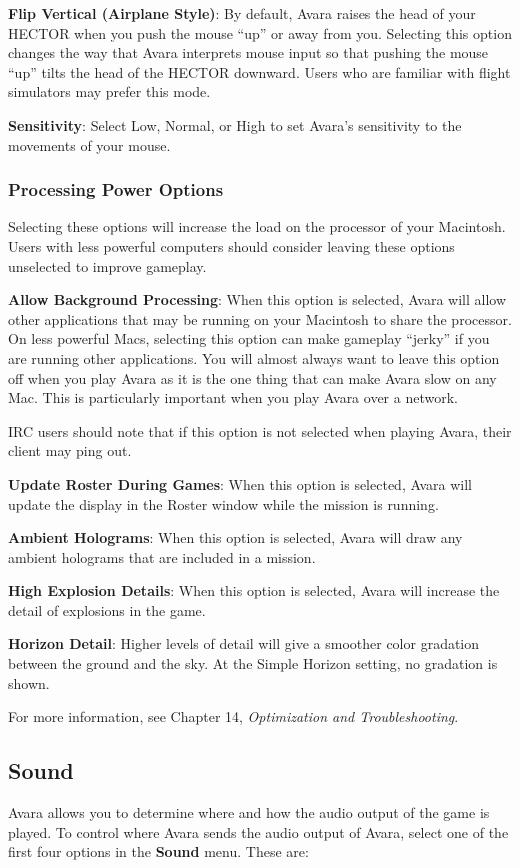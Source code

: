 \documentclass{article}
\begin{document}
\textbf{Flip Vertical (Airplane Style)}: By default, Avara raises the head of your HECTOR when you push the mouse ``up'' or away from you. Selecting this option changes the way that Avara interprets mouse input so that pushing the mouse ``up'' tilts the head of the HECTOR downward. Users who are familiar with flight simulators may prefer this mode.

\textbf{Sensitivity}: Select Low, Normal, or High to set Avara's sensitivity to the movements of your mouse.

\subsubsection{Processing Power Options}
Selecting these options will increase the load on the processor of your Macintosh. Users with less powerful computers should consider leaving these options unselected to improve gameplay.

\textbf{Allow Background Processing}: When this option is selected, Avara will allow other applications that may be running on your Macintosh to share the processor. On less powerful Macs, selecting this option can make gameplay ``jerky'' if you are running other applications. You will almost always want to leave this option off when you play Avara as it is the one thing that can make Avara slow on any Mac. This is particularly important when you play Avara over a network.

IRC users should note that if this option is not selected when playing Avara, their client may ping out.

\textbf{Update Roster During Games}: When this option is selected, Avara will update the display in the Roster window while the mission is running.

\textbf{Ambient Holograms}: When this option is selected, Avara will draw any ambient holograms that are included in a mission.

\textbf{High Explosion Details}: When this option is selected, Avara will increase the detail of explosions in the game.

\textbf{Horizon Detail}: Higher levels of detail will give a smoother color gradation between the ground and the sky. At the Simple Horizon setting, no gradation is shown.

For more information, see Chapter 14, \textit{Optimization and Troubleshooting}.

\subsection{Sound}
Avara allows you to determine where and how the audio output of the game is played. To control where Avara sends the audio output of Avara, select one of the first four options in the \textbf{Sound} menu. These are:
\end{document}
